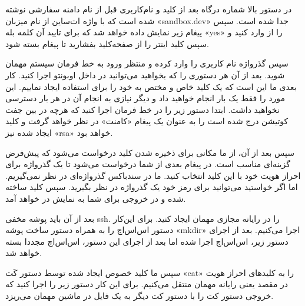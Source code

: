 در دستور بالا شماره درگاه بعد از کلید 
 و نام‌کاربری قبل از نام دامنه سفارشی  نوشته شده است که با  واژه ات‌ساین  
 از نام میزبان «sandbox.dev» جدا شده است. سپس پیغام زیر نمایش داده خواهد شد که برای تایید آن کلمه بله «yes» را از وارد کنید و سپس کلید اینتر را از صفحه‌کلید بفشارید تا پیغام بسته شود.
\\
\begin{latin}
    
\end{latin}
سپس گذرواژه نام کاربری را وارد کرده و منتظر ورود به خط فرمان سیستم مهمان شوید. بعد از آن هر دستوری را که بخواهید می‌توانید در داخل اوبونتو اجرا کنید. کار بعدی ما این است که یک کلید خاص و مختص به خود  را برای استفاده ایجاد نماییم. این مورد را فقط یک بار انجام خواهید داد و دیگر نیازی به انجام آن در هر بار دسترسی نخواهید داشت. ابتدا دستور زیر را در خط فرمان اجرا کنید که هرچه در بین جفت کوتیشن درج شده است را به عنوان یک پیغام «کامنت» در نظر خواهد گرفت و کلید ایجاد شده نیز «rsa» خواهد بود.
\\
\begin{latin}
    
\end{latin}
سپس بعد از آن، از ما مکانی برای ذخیره شدن کلید درخواست می‌شود که پیش‌فرض گزینه‌ای مناسب است. در پیغام بعدی از شما درخواست می‌شود تا یک گذرواژه برای احراز هویت خود با این کلید انتخاب کنید. ما در سندباکس گذرواژه‌ای در نظر نمی‌گیریم. اما اگر خواستید می‌توانید برای رمز خود یک گذرواژه در نظر بگیرید. سپس کلید ساخته شده و در خروجی برای شما به نمایش در خواهد آمد.
\\
\begin{latin}
    
\end{latin}
بعد از آن باید پوشه مخفی ssh. را در رایانه مجازی مهمان ایجاد کنید. برای این‌کار دستور اس‌اس‌اچ را به همراه دستور ساخت پوشه «mkdir» اجرا می‌کنیم. بعد از اجرای دستور زیر، اس‌اس‌اچ اجرا شده اما بعد از اجرای این دستور، اس‌اس‌اچ مجددا بسته خواهد شد.
\
\begin{latin}
    
\end{latin}
سپس ما کلید خصوص ایجاد شده توسط دستور  کَت «cat» را به کلیدهای احراز هویت در مقصد یعنی رایانه مهمان منتقل می‌کنیم. برای این کار دستور زیر را اجرا کنید که خروجی دستور کت را با دستور کت دیگر  به یک فایل در ماشین مهمان می‌ریزد.
